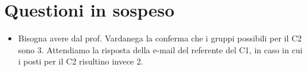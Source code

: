 \documentclass[../verbale-2016-12-07.tex]{subfiles}
\begin{document}
	\section{Questioni in sospeso} %
	\begin{itemize}
		\item Bisogna avere dal prof. Vardanega la conferma che i gruppi possibili per il C2 sono 3. Attendiamo la risposta della e-mail del referente del C1, in caso in cui i posti per il C2 risultino invece 2.
	\end{itemize}
\end{document}
